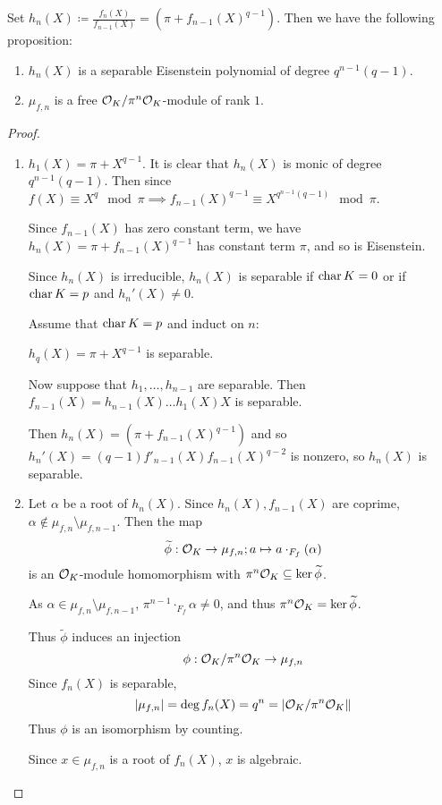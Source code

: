 \documentclass[10pt,a4paper]{article}
\begin{document}
Set $h_n(X) \coloneqq \frac{f_n(X)}{f_{n-1}(X)} = (\pi+f_{n-1}(X)^{q-1})$. Then we have the following proposition:
\begin{proposition}
  \begin{enumerate}
    \item $h_n(X)$ is a separable Eisenstein polynomial of degree $q^{n-1}(q-1)$.
    \item $\mu_{f,n}$ is a free $\mathcal{O}_K/\pi^n \mathcal{O}_K$-module of rank $1$.
  \end{enumerate}
\end{proposition}
\begin{proof}\hspace*{0cm}
  \begin{enumerate}
    \item $h_1(X) = \pi+X^{q-1}$.
    It is clear that $h_n(X)$ is monic of degree $q^{n-1}(q-1)$. Then since $f(X) \equiv X^q \mod \pi \implies f_{n-1}(X)^{q-1} \equiv X^{q^{n-1}(q-1)}\mod \pi$.

    Since $f_{n-1}(X)$ has zero constant term, we have $h_n(X) = \pi+f_{n-1}(X)^{q-1}$ has constant term $\pi$, and so is Eisenstein.

    Since $h_n(X)$ is irreducible, $h_n(X)$ is separable if $\operatorname{char} K = 0$ or if $\operatorname{char} K = p$ and $h_n'(X) \neq 0$.

    Assume that $\operatorname{char} K = p$ and induct on $n$:

    $h_q(X) = \pi + X^{q-1}$ is separable.

    Now suppose that $h_1, \ldots, h_{n-1}$ are separable. Then $f_{n-1}(X) = h_{n-1}(X)\ldots h_1(X)X$ is separable.

    Then $h_n(X) = (\pi + f_{n-1}(X)^{q-1})$ and so $h_{n}'(X) = (q-1)f'_{n-1}(X)f_{n-1}(X)^{q-2}$ is nonzero, so $h_n(X)$ is separable.

    \item Let $\alpha$ be a root of $h_n(X)$. Since $h_n(X), f_{n-1}(X)$ are coprime, $\alpha \notin \mu_{f, n}\setminus \mu_{f, n-1}$. Then the map
    \[\widetilde{\phi}:\mathcal{O}_K \to \mu_{f,n}; a\mapsto a\cdot_{F_f}(\alpha)\]
    is an $\mathcal{O}_K$-module homomorphism with $\pi^n\mathcal{O}_K \subseteq \ker \widetilde{\phi}$.

    As $\alpha \in \mu_{f,n}\setminus \mu_{f, n-1}$, $\pi^{n-1}\cdot_{F_f}\alpha \neq 0$, and thus $\pi^n \mathcal{O}_K =\ker \widetilde{\phi}$.

    Thus $\tilde{\phi}$ induces an injection
    \[\phi:\mathcal{O}_K/\pi^n\mathcal{O}_K \to \mu_{f,n}\]
    Since $f_n(X)$ is separable,
    \[|\mu_{f,n}|=  \deg f_n(X) = q^n = |\mathcal{O}_K/\pi^n\mathcal{O}_K\|\]
    Thus $\phi$ is an isomorphism by counting.

    Since $x \in \mu_{f, n}$ is a root of $f_n(X)$, $x$ is algebraic.
  \end{enumerate}
\end{proof}
\end{document}

